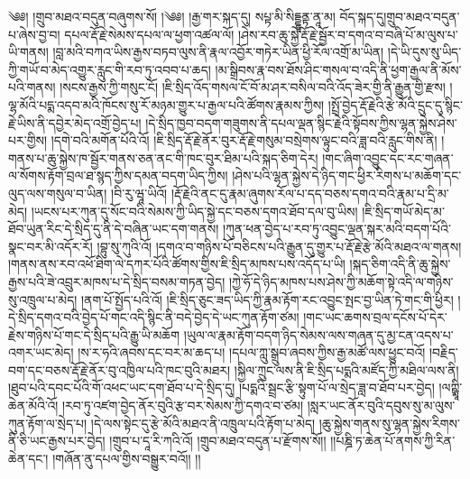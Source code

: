 \setcounter{footnote}{0} 
༄༅། །གྲུབ་མཐའ་བདུན་བཞུགས་སོ། །༄༅། །རྒྱ་གར་སྐད་དུ། སཔྟ་མི་སིདྡྷཱནྟ་ནཱ་མ། བོད་སྐད་དུ།གྲུབ་མཐའ་བདུན་པ་ཞེས་བྱ་བ། དཔལ་རྡོ་རྗེ་སེམས་དཔལ་ལ་ཕྱག་འཚལ་ལོ། །ཤེས་རབ་ཆུ་སྐྱེ་རྡོ་རྗེ་སྦྱོར་བ་དགའ་བ་བཞི་པོ་མ་ལུས་པ་ཡི་གནས། །བླ་མའི་བཀའ་ཡིས་རྒྱས་བཏབ་ལུས་ནི་རྣལ་འབྱོར་གཏེར་ཡིན་ཕྱི་རོལ་འགྲོ་མ་ཡིན། །དེ་ཡི་དུས་སུ་ཡིད་ཀྱི་གཡོ་བ་མེད་འགྱུར་རླུང་གི་རབ་ཏུ་འབབ་པ་ཆད། །མ་སྒྲིབས་རྣ་བས་ཐོས་ཤིང་གསལ་བ་འདི་ནི་ཕྱག་རྒྱལ་ནི་མོས་པའི་གནས། །སངས་རྒྱས་ཀྱི་གསུང་ངོ། །ཇི་སྲིད་འོད་གསལ་ངོ་བོ་མ་ཤར་བསིལ་བའི་འོད་ཟེར་གྱི་ནི་རྒྱུན་གྱི་རྫས། །ལྷ་མོའི་པདྨ་འདབ་མའི་ཁོངས་སུ་རོ་མཉམ་གྱུར་པ་རྒྱལ་པའི་ཚོགས་རྣམས་ཀྱིས། །སྤྲོ་བྱེད་རྡོ་རྗེའི་རྩེ་མོའི་དྲུང་དུ་སྙིང་རྗེ་ཡིས་ནི་དབྱེར་མེད་འགྲོ་བྱེད་པ། །དེ་སྲིད་ཁྱབ་བདག་གཟུགས་ནི་དཔལ་ལྡན་སྙིང་རྗེའི་སྟོབས་ཀྱིས་ལྷན་སྐྱེས་ཤེས་པར་གྱིས། །དགེ་བའི་མགོན་པོའི་འོ། །ཇི་སྲིད་རྡོ་རྗེ་ནོར་བུར་རྡོ་རྗེ་གསུམ་བསྲེགས་ལྟུང་བའི་ཟླ་བའི་རླུང་གིས་ནི། །གནས་པ་ཆུ་སྐྱེས་ཁ་སྦྱོར་གནས་ཅན་ནང་གི་ཁང་བུར་ཐིམ་པའི་སྐད་ཅིག་དེར། །གང་ཞིག་འབྱུང་དང་རང་གཞན་ལ་སོགས་རྟོག་བྲལ་ཐ་སྙད་ཀྱིས་དམན་བདག་ཡིད་ཀྱིས། །ཤེས་པའི་ལྷན་སྐྱེས་དེ་ཉིད་གང་ཕྱིར་རིགས་པ་མཆོག་དང་ལུད་ལས་གསུལ་བ་ཡིན། །བི་རུ་ཝཱ་ཡིའོ། །རྡོ་རྗེའི་ནང་དུ་རྣམ་ཞུགས་རོལ་པ་དད་བཅས་དགའ་བའི་རྣམ་པ་དྲི་མ་མེད། །ཡངས་པར་ཀུན་དུ་སོང་བའི་སེམས་ཀྱི་ཡིད་སྐྱེ་དང་བཅས་དགའ་ཐོབ་དལ་བུ་ཡིས། །ཇི་སྲིད་གཡོ་མེད་མ་ཐོབ་ཡུན་རིང་དེ་སྲིད་དུ་ནི་དེ་བཞིན་ཡང་དག་གནས། །ཀུན་ཕན་བྱེད་པ་རབ་ཏུ་འབྱུང་ལྡན་སྐར་མའི་བདག་པོའི་སྣང་བར་མི་འདོར་རོ། །བྷུ་སུ་ཀུའི་འོ། །དགའ་བ་གཉིས་པོ་བཅིངས་པའི་རྒྱུན་དུ་གྱུར་པ་རྡོ་རྗེ་རྩེ་མོའི་མཐའ་ལ་གནས། །གནས་ནས་རབ་འཕོ་ཐིག་ལེ་དཀར་པོའི་ཚོགས་གྱིས་ཇི་སྲིད་མཁས་པས་འདོད་པ་ཡི། །སྐད་ཅིག་འདི་ནི་ཆུ་སྐྱེས་རྒྱས་པའི་ཟེ་འབྲུར་མཁས་པ་དེ་སྲིད་བསམ་གཏན་བྱེད། །ཀྱེ་ཧོ་དེ་ཉིད་མཁས་པས་ཤེས་ཀྱི་མཆོག་སྟེ་འདི་ལ་གཉིས་སུ་འཁྲུལ་པ་མེད། །ནག་པོ་སྤྱོད་པའི་འོ། །ཇི་སྲིད་ཅུང་ཟད་ཡིད་ཀྱི་རྣམ་རྟོག་རང་འབྱུང་སྤང་བྱ་ཡིན་ཏེ་གང་གི་ཕྱིར། །དེ་སྲིད་དགའ་བའི་བྱེད་པོ་གང་འདི་སྙིང་ནི་བདེ་བྱེད་དེ་ཡང་ཀུན་རྟོག་ཙམ། །གང་ཡང་ཆགས་བྲལ་དངོས་པོ་དེར་རྗེས་གཉིས་པོ་གང་དེ་སྲིད་པའི་རྒྱུ་ཡི་མཆོག །ཡུལ་ལ་རྣམ་རྟོག་བདག་ཉིད་སེམས་ལས་གཞན་དུ་མྱ་ངན་འདས་པ་འགར་ཡང་མེད། །ས་ར་ཧའི་ཞབས་དང་བར་མ་ཆད་པ། །དཔལ་ཀླུ་སྒྲུབ་ཞབས་ཀྱིས་རྒྱ་མཚོ་ལས་ཕྱུང་བའོ། །བརྗིད་བག་དང་བཅས་རྡོ་རྗེ་ནོར་བུ་འཁྱིལ་པའི་ཁང་བུའི་མཐར། །སྐྱིལ་ཀྲུང་ལས་ནི་ཇི་སྲིད་པདྨའི་མཛོད་ཀྱི་མཐིལ་ལས་ནི། །ཐུབ་པའི་དབང་པོའི་གོ་འཕང་ཡང་དག་ཐོབ་པ་དེ་སྲིད་དུ། །པདྨའི་སྦྲང་རྩི་སྟུག་པོ་ལ་སྲེད་ཟླ་བ་ཐོབ་པར་བྱེད། །ལཀྵྨཱི་ཆེན་མོའི་འོ། །རབ་ཏུ་འཛག་བྱེད་ནོར་བུའི་རྩ་བར་སེམས་ཀྱི་དགའ་བ་ཙམ། །སླར་ཡང་ནོར་བུའི་དབུས་སུ་མ་ལུས་ཀུན་རྟོག་ལ་སྲེད་པ། །དེ་ལས་སྟེང་དུ་རྩེ་མོའི་མཐའ་ནི་འཁྲུལ་པའི་རྟོག་པ་མེད། །ཆུ་སྐྱེས་གནས་སུ་ལྷན་སྐྱེས་རིགས་ནི་ཅི་ཡང་རྒྱས་པར་བྱེད། །གྲུབ་པ་དཱ་རི་ཀའི་འོ། །གྲུབ་མཐའ་བདུན་པ་རྫོགས་སོ།། །།པཎྜི་ཏ་ཆེན་པོ་ནགས་ཀྱི་རིན་ཆེན་དང་། །གཞོན་ནུ་དཔལ་གྱིས་བསྒྱུར་བའོ།། །།